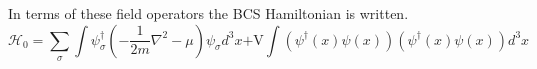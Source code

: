 \documentclass{article}
\begin{document}
In terms of these field operators the BCS Hamiltonian is written.
\begin{equation}
    \mathcal{H}_0=
    \sum_{\substack{
        \sigma
    }}
    \int{
        \psi^\dagger_\sigma\left(-\frac{1}{2m}\nabla^2-\mu\right)\psi_\sigma{d^3}x
    }
    {\textrm{+V}}
    \int{
        (\psi^\dagger(x)\psi(x))(\psi^\dagger(x)\psi(x)){d^3}x
    }
\end{equation}
\end{document}
